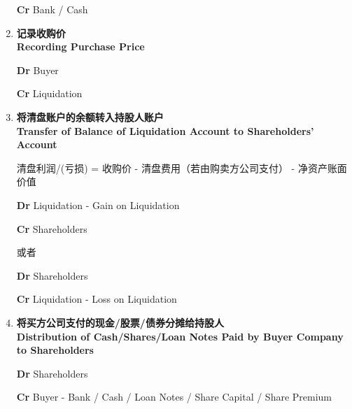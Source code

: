 \documentclass{article}
\begin{document}
\begin{enumerate}
\begin{mdframed}[backgroundcolor=gray!10]
    \hspace{1.7em}\textbf{Cr} Bank / Cash
    \end{mdframed}
    
    \newpage
    \item \textbf{记录收购价\\Recording Purchase Price}
    \begin{mdframed}[backgroundcolor=gray!10]
    \textbf{Dr} Buyer

    \hspace{1.7em}\textbf{Cr} Liquidation
    \end{mdframed}

    \item \textbf{将清盘账户的余额转入持股人账户\\Transfer of Balance of Liquidation Account to Shareholders' Account}
    
    清盘利润/(亏损) = 收购价 - 清盘费用（若由购卖方公司支付） - 净资产账面价值 

    \begin{mdframed}[backgroundcolor=gray!10]
    \textbf{Dr} Liquidation - Gain on Liquidation

    \hspace{1.7em}\textbf{Cr} Shareholders
    \end{mdframed}
    或者
    \begin{mdframed}[backgroundcolor=gray!10]
    \textbf{Dr} Shareholders

    \hspace{1.7em}\textbf{Cr} Liquidation - Loss on Liquidation
    \end{mdframed}

    \item \textbf{将买方公司支付的现金/股票/债券分摊给持股人\\Distribution of Cash/Shares/Loan Notes Paid by Buyer Company to Shareholders}
    
    \begin{mdframed}[backgroundcolor=gray!10]
    \textbf{Dr} Shareholders

    \hspace{1.7em}\textbf{Cr} Buyer - Bank / Cash / Loan Notes / Share Capital / Share Premium
    \end{mdframed}
    
\end{enumerate}
\end{document}
